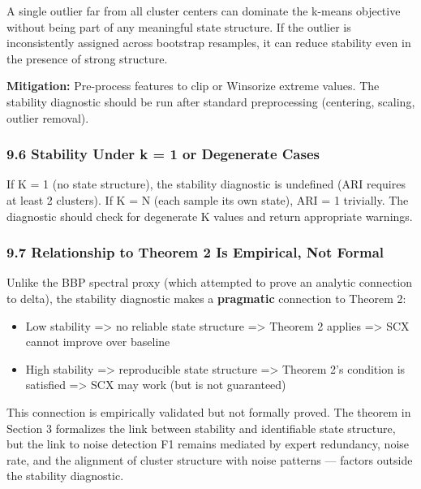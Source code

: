 \documentclass[
  12pt,
]{article}
\providecommand{\tightlist}{%
  \setlength{\itemsep}{0pt}\setlength{\parskip}{0pt}}
\begin{document}
A single outlier far from all cluster centers can dominate the k-means
objective without being part of any meaningful state structure. If the
outlier is inconsistently assigned across bootstrap resamples, it can
reduce stability even in the presence of strong structure.

\textbf{Mitigation:} Pre-process features to clip or Winsorize extreme
values. The stability diagnostic should be run after standard
preprocessing (centering, scaling, outlier removal).

\subsubsection{9.6 Stability Under k = 1 or Degenerate
Cases}\label{stability-under-k-1-or-degenerate-cases}

If K = 1 (no state structure), the stability diagnostic is undefined
(ARI requires at least 2 clusters). If K = N (each sample its own
state), ARI = 1 trivially. The diagnostic should check for degenerate K
values and return appropriate warnings.

\subsubsection{9.7 Relationship to Theorem 2 Is Empirical, Not
Formal}\label{relationship-to-theorem-2-is-empirical-not-formal}

Unlike the BBP spectral proxy (which attempted to prove an analytic
connection to delta), the stability diagnostic makes a
\textbf{pragmatic} connection to Theorem 2:

\begin{itemize}
\tightlist
\item
  Low stability =\textgreater{} no reliable state structure
  =\textgreater{} Theorem 2 applies =\textgreater{} SCX cannot improve
  over baseline
\item
  High stability =\textgreater{} reproducible state structure
  =\textgreater{} Theorem 2's condition is satisfied =\textgreater{} SCX
  may work (but is not guaranteed)
\end{itemize}

This connection is empirically validated but not formally proved. The
theorem in Section 3 formalizes the link between stability and
identifiable state structure, but the link to noise detection F1 remains
mediated by expert redundancy, noise rate, and the alignment of cluster
structure with noise patterns --- factors outside the stability
diagnostic.
\end{document}
